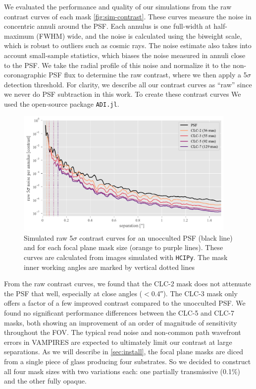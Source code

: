 \documentclass[]{spie}  %
\begin{document}
We evaluated the performance and quality of our simulations from the raw contrast curves of each mask \autoref{fig:sim-contrast}. These curves measure the noise in concentric annuli around the PSF. Each annulus is one full-width at half-maximum (FWHM) wide, and the noise is calculated using the biweight scale, which is robust to outliers such as cosmic rays. The noise estimate also takes into account small-sample statistics\cite{mawet2014}, which biases the noise measured in annuli close to the PSF. We take the radial profile of this noise and normalize it to the non-coronagraphic PSF flux to determine the raw contrast, where we then apply a 5$\sigma$ detection threshold. For clarity, we describe all our contrast curves as ``raw'' since we never do PSF subtraction in this work. To create these contrast curves We used the open-source package \texttt{ADI.jl}\cite{lucas2020}.

\begin{figure}
   \centering
   \includegraphics[width=0.95\textwidth]{figures/simulated_curves}
   \caption{Simulated raw 5$\sigma$ contrast curves for an unocculted PSF (black line) and for each focal plane mask size (orange to purple lines). These curves are calculated from images simulated with \texttt{HCIPy}. The mask inner working angles are marked by vertical dotted lines}\label{fig:sim-contrast}
\end{figure}

From the raw contrast curves, we found that the CLC-2 mask does not attenuate the PSF that well, especially at close angles ($<$\ang{;;0.4}). The CLC-3 mask only offers a factor of a few improved contrast compared to the unocculted PSF. We found no significant performance differences between the CLC-5 and CLC-7 masks, both showing an improvement of an order of magnitude of sensitivity throughout the FOV. The typical read noise and non-common path wavefront errors in VAMPIRES are expected to ultimately limit our contrast at large separations. As we will describe in \autoref{sec:install}, the focal plane masks are diced from a single piece of glass producing four substrates. So we decided to construct all four mask sizes with two variations each: one partially transmissive (0.1\%) and the other fully opaque.
\end{document}

